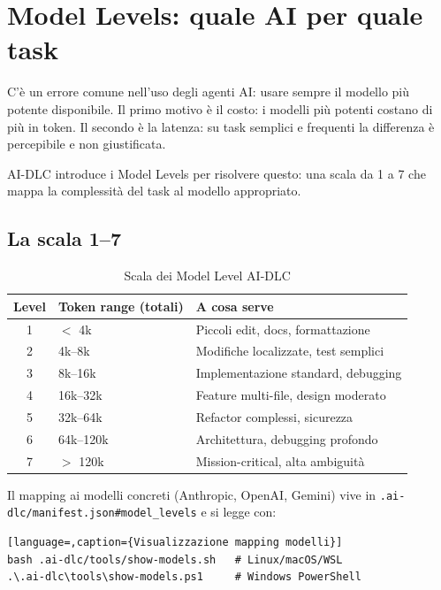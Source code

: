 ﻿%

\chapter{Model Levels: quale AI per quale task}
\label{ch:model-levels}

C'è un errore comune nell'uso degli agenti AI: usare sempre il modello più potente disponibile. Il primo motivo è il costo: i modelli più potenti costano di più in token. Il secondo è la latenza: su task semplici e frequenti la differenza è percepibile e non giustificata.

AI-DLC introduce i Model Levels per risolvere questo: una scala da 1 a 7 che mappa la complessità del task al modello appropriato.

\section{La scala 1--7}
\label{sec:08-scala}

\begin{table}[htbp]
  \centering
  \begin{tabular}{cll}
    \toprule
    \textbf{Level} & \textbf{Token range (totali)} & \textbf{A cosa serve} \\
    \midrule
    1 & $<$ 4k & Piccoli edit, docs, formattazione \\
    2 & 4k--8k & Modifiche localizzate, test semplici \\
    3 & 8k--16k & Implementazione standard, debugging \\
    4 & 16k--32k & Feature multi-file, design moderato \\
    5 & 32k--64k & Refactor complessi, sicurezza \\
    6 & 64k--120k & Architettura, debugging profondo \\
    7 & $>$ 120k & Mission-critical, alta ambiguità \\
    \bottomrule
  \end{tabular}
  \caption{Scala dei Model Level AI-DLC}
  \label{tab:08-scala}
\end{table}

Il mapping ai modelli concreti (Anthropic, OpenAI, Gemini) vive in \texttt{.ai-dlc/manifest.json\#model\_levels} e si legge con:

\begin{lstlisting}[language=,caption={Visualizzazione mapping modelli}]
bash .ai-dlc/tools/show-models.sh   # Linux/macOS/WSL
.\.ai-dlc\tools\show-models.ps1     # Windows PowerShell
\end{lstlisting}

